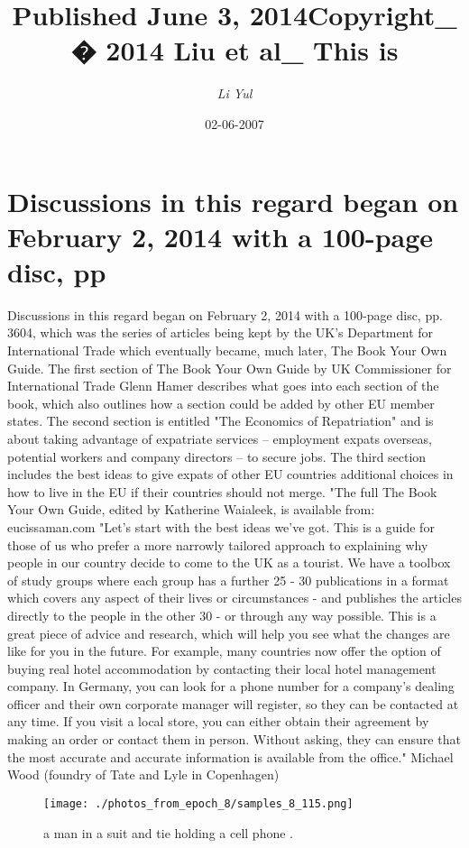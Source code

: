 \documentclass{article}%
\title{Published June 3, 2014Copyright\_ � 2014 Liu et al\_ This is}%
\author{\textit{Li Yul}}%
\date{02-06-2007}%
\begin{document}
%
\normalsize%
\maketitle%
\section{Discussions in this regard began on February 2, 2014 with a 100{-}page disc, pp}%
\label{sec:DiscussionsinthisregardbeganonFebruary2,2014witha100{-}pagedisc,pp}%
Discussions in this regard began on February 2, 2014 with a 100{-}page disc, pp. 3604, which was the series of articles being kept by the UK's Department for International Trade which eventually became, much later, The Book Your Own Guide. The first section of The Book Your Own Guide by UK Commissioner for International Trade Glenn Hamer describes what goes into each section of the book, which also outlines how a section could be added by other EU member states. The second section is entitled "The Economics of Repatriation" and is about taking advantage of expatriate services – employment expats overseas, potential workers and company directors – to secure jobs. The third section includes the best ideas to give expats of other EU countries additional choices in how to live in the EU if their countries should not merge. "The full The Book Your Own Guide, edited by Katherine Waialeek, is available from: eucissaman.com\newline%
"Let's start with the best ideas we've got. This is a guide for those of us who prefer a more narrowly tailored approach to explaining why people in our country decide to come to the UK as a tourist. We have a toolbox of study groups where each group has a further 25 {-} 30 publications in a format which covers any aspect of their lives or circumstances {-} and publishes the articles directly to the people in the other 30 {-} or through any way possible. This is a great piece of advice and research, which will help you see what the changes are like for you in the future. For example, many countries now offer the option of buying real hotel accommodation by contacting their local hotel management company. In Germany, you can look for a phone number for a company's dealing officer and their own corporate manager will register, so they can be contacted at any time. If you visit a local store, you can either obtain their agreement by making an order or contact them in person. Without asking, they can ensure that the most accurate and accurate information is available from the office." Michael Wood (foundry of Tate and Lyle in Copenhagen)\newline%

%


\begin{figure}[h!]%
\centering%
\texttt{[image: ./photos\_from\_epoch\_8/samples\_8\_115.png]}%
\caption{a man in a suit and tie holding a cell phone .}%
\end{figure}

%
\end{document}

